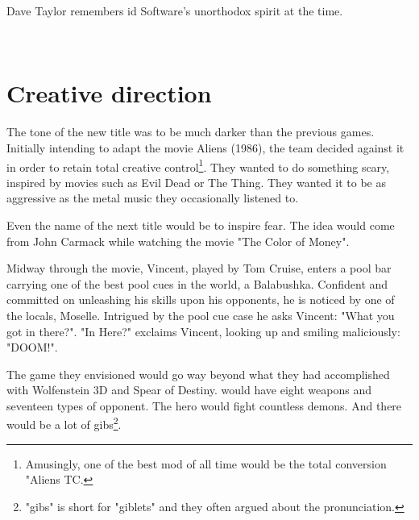 \par
Dave Taylor remembers id Software's unorthodox spirit at the time.\\
\par
\vspace{11pt}
\\
\par
\vspace{11pt}





\section{Creative direction}
The tone of the new title was to be much darker than the previous games. Initially intending to adapt the movie Aliens (1986), the team decided against it in order to retain total creative control\footnote{Amusingly, one of the best mod of all time would be the total conversion "Aliens TC.}. They wanted to do something scary, inspired by movies such as Evil Dead or The Thing. They wanted it to be as aggressive as the metal music they occasionally listened to.\\
\par
Even the name of the next title would be to inspire fear. The idea would come from John Carmack while watching the movie "The Color of Money".\\ 
\par
Midway through the movie, Vincent, played by Tom Cruise, enters a pool bar carrying one of the best pool cues in the world, a Balabushka. Confident and committed on unleashing his skills upon his opponents, he is noticed by one of the locals, Moselle. Intrigued by the pool cue case he asks Vincent: "What you got in there?". "In Here?" exclaims Vincent, looking up and smiling maliciously: "DOOM!".\\
\par

\par
{}
\par
\vspace{-15pt}
The game they envisioned would go way beyond what they had accomplished with Wolfenstein 3D and Spear of Destiny. \doom{} would have eight weapons and seventeen types of opponent. The hero would fight countless demons. And there would be a lot of gibs\footnote{"gibs" is short for "giblets" and they often argued about the pronunciation.}.

